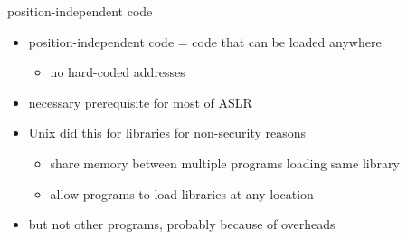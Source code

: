 \begin{frame}{position-independent code}
    \begin{itemize}
    \item position-independent code = code that can be loaded anywhere
        \begin{itemize}
        \item no hard-coded addresses
        \end{itemize}
    \item necessary prerequisite for most of ASLR
    \vspace{.5cm}
    \item Unix did this for libraries for non-security reasons
        \begin{itemize}
        \item share memory between multiple programs loading same library
        \item allow programs to load libraries at any location
        \end{itemize}
    \item but not other programs, probably because of overheads
    \end{itemize}
\end{frame}
